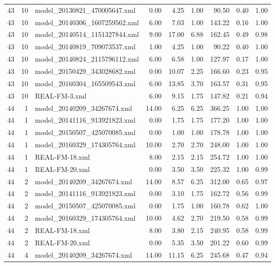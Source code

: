 \begin{table}[ht]
\begin{tabular}{rrlrrrrrr}
   43 &  10 & model\_20130821\_470005647.xml & 0.00 & 4.25 & 1.00 & 90.50 & 0.40 & 1.00 \\ 
   43 &  10 & model\_20140306\_1607259562.xml & 6.00 & 7.03 & 1.00 & 143.22 & 0.16 & 1.00 \\ 
   43 &  10 & model\_20140514\_1151327844.xml & 9.00 & 17.00 & 6.88 & 162.45 & 0.49 & 0.98 \\ 
   43 &  10 & model\_20140819\_709073537.xml & 1.00 & 4.25 & 1.00 & 90.22 & 0.40 & 1.00 \\ 
   43 &  10 & model\_20140824\_2115796112.xml & 6.00 & 6.58 & 1.00 & 127.97 & 0.17 & 1.00 \\ 
   43 &  10 & model\_20150429\_343028682.xml & 0.00 & 10.07 & 2.25 & 166.60 & 0.23 & 0.95 \\ 
   43 &  10 & model\_20160304\_165509543.xml & 6.00 & 13.85 & 3.70 & 163.57 & 0.31 & 0.95 \\ 
   43 &  10 & REAL-FM-3.xml & 6.00 & 9.15 & 1.75 & 147.82 & 0.21 & 0.94 \\ 
   44 &   1 & model\_20140209\_34267674.xml & 14.00 & 6.25 & 6.25 & 366.25 & 1.00 & 1.00 \\ 
   44 &   1 & model\_20141116\_913921823.xml & 0.00 & 1.75 & 1.75 & 177.20 & 1.00 & 1.00 \\ 
   44 &   1 & model\_20150507\_425070085.xml & 0.00 & 1.00 & 1.00 & 178.78 & 1.00 & 1.00 \\ 
   44 &   1 & model\_20160329\_174305764.xml & 10.00 & 2.70 & 2.70 & 248.00 & 1.00 & 1.00 \\ 
   44 &   1 & REAL-FM-18.xml & 8.00 & 2.15 & 2.15 & 254.72 & 1.00 & 1.00 \\ 
   44 &   1 & REAL-FM-20.xml & 0.00 & 3.50 & 3.50 & 225.32 & 1.00 & 0.99 \\ 
   44 &   2 & model\_20140209\_34267674.xml & 14.00 & 8.57 & 6.25 & 312.00 & 0.65 & 0.97 \\ 
   44 &   2 & model\_20141116\_913921823.xml & 0.00 & 3.10 & 1.75 & 162.72 & 0.56 & 0.99 \\ 
   44 &   2 & model\_20150507\_425070085.xml & 0.00 & 1.75 & 1.00 & 160.78 & 0.62 & 1.00 \\ 
   44 &   2 & model\_20160329\_174305764.xml & 10.00 & 4.62 & 2.70 & 219.50 & 0.58 & 0.99 \\ 
   44 &   2 & REAL-FM-18.xml & 8.00 & 3.80 & 2.15 & 240.95 & 0.58 & 0.99 \\ 
   44 &   2 & REAL-FM-20.xml & 0.00 & 5.35 & 3.50 & 201.22 & 0.60 & 0.99 \\ 
   44 &   4 & model\_20140209\_34267674.xml & 14.00 & 11.15 & 6.25 & 245.68 & 0.47 & 0.94 \\ 

\end{tabular}
\end{table}
